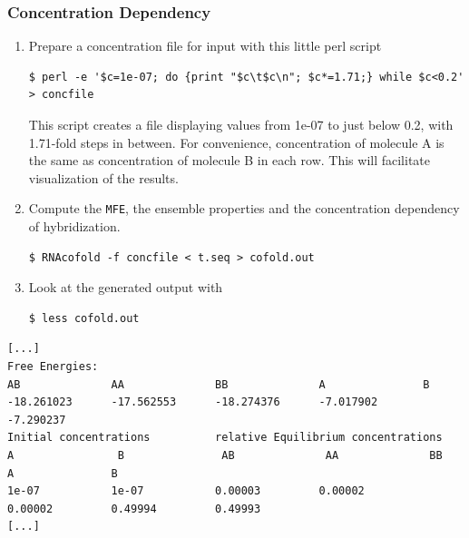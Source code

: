 \documentclass[a4paper]{article}
\newcommand{\frametitle}[1]{\subsubsection{#1}}
\begin{document}
  \frametitle{Concentration Dependency}
  \begin{enumerate}
  \item Prepare a concentration file for input with this little perl script
\begin{verbatim}
$ perl -e '$c=1e-07; do {print "$c\t$c\n"; $c*=1.71;} while $c<0.2' > concfile
\end{verbatim}
\noindent
This script creates a file displaying values from 1e-07 to just below 0.2, with 1.71-fold steps
in between. For convenience, concentration of molecule A is the same as concentration of
molecule B in each row. This will facilitate visualization of the results.
  \item Compute the \texttt{MFE}, the ensemble properties
    and the concentration dependency of hybridization.
\begin{verbatim}
$ RNAcofold -f concfile < t.seq > cofold.out
\end{verbatim}
  \item Look at the generated output with 
\begin{verbatim}
$ less cofold.out
\end{verbatim}
  \end{enumerate}
\begin{scriptsize}
\begin{verbatim}
[...]
Free Energies:
AB              AA              BB              A               B
-18.261023      -17.562553      -18.274376      -7.017902       -7.290237
Initial concentrations          relative Equilibrium concentrations
A                B               AB              AA              BB              A               B
1e-07           1e-07           0.00003         0.00002         0.00002         0.49994         0.49993
[...]
\end{verbatim}
\end{scriptsize}
\end{document}
